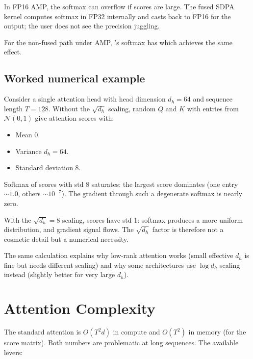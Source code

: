 In FP16 AMP, the softmax can overflow if scores are large. The
fused SDPA kernel computes softmax in FP32 internally and casts
back to FP16 for the output; the user does not see the precision
juggling.

For the non-fused path under AMP, \Lucid's softmax has
 which achieves the same effect.

\subsection{Worked numerical example}
\label{ssec:attention:numerical_example}

Consider a single attention head with head dimension $d_h = 64$
and sequence length $T = 128$. Without the $\sqrt{d_h}$ scaling,
random $Q$ and $K$ with entries from $\mathcal{N}(0, 1)$ give
attention scores with:
\begin{itemize}
  \item Mean 0.
  \item Variance $d_h = 64$.
  \item Standard deviation $8$.
\end{itemize}
Softmax of scores with std 8 saturates: the largest score
dominates (one entry $\sim 1.0$, others $\sim 10^{-7}$). The
gradient through such a degenerate softmax is nearly zero.

With the $\sqrt{d_h} = 8$ scaling, scores have std 1: softmax
produces a more uniform distribution, and gradient signal
flows. The $\sqrt{d_h}$ factor is therefore not a cosmetic
detail but a numerical necessity.

The same calculation explains why low-rank attention works
(small effective $d_h$ is fine but needs different scaling) and
why some architectures use $\log d_h$ scaling instead (slightly
better for very large $d_h$).

\section{Attention Complexity}
\label{sec:attention:complexity}

The standard attention is $O(T^2 d)$ in compute and $O(T^2)$ in
memory (for the score matrix). Both numbers are problematic at
long sequences. The available levers:

